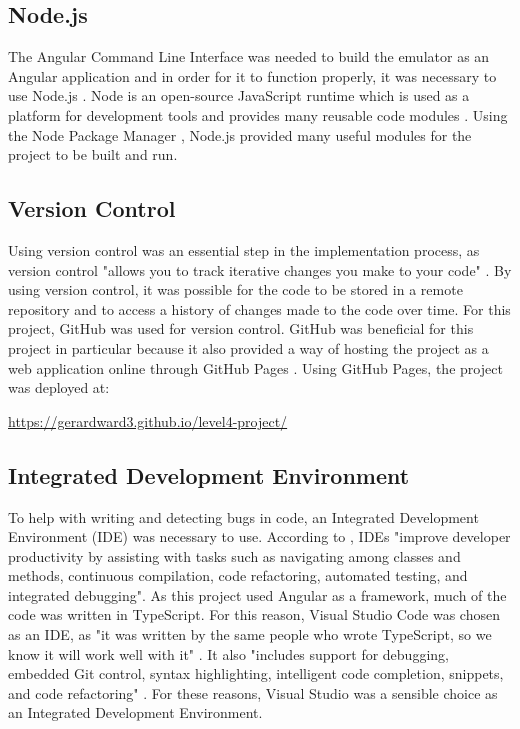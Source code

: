 \documentclass{l4proj}
\begin{document}
\subsection{Node.js}
The Angular Command Line Interface was needed to build the emulator as an Angular application and in order for it to function properly, it was necessary to use Node.js \citep{node19}. Node is an open-source JavaScript runtime which is used as a platform for development tools and provides many reusable code modules \citep{ClowNode18}. Using the Node Package Manager \citep{npm19}, Node.js provided many useful modules for the project to be built and run.

\subsection{Version Control}
Using version control was an essential step in the implementation process, as version control "allows you to track iterative changes you make to your code" \citep{vcs16}. By using version control, it was possible for the code to be stored in a remote repository and to access a history of changes made to the code over time. For this project, GitHub \citep{github19} was used for version control. GitHub was beneficial for this project in particular because it also provided a way of hosting the project as a web application online through GitHub Pages \citep{githubpages19}. Using GitHub Pages, the project was deployed at:

 \url{https://gerardward3.github.io/level4-project/}
 
\subsection{Integrated Development Environment}
To help with writing and detecting bugs in code, an Integrated Development Environment (IDE) was necessary to use. According to \citet{ide15}, IDEs "improve developer productivity by assisting with tasks such as navigating among classes and methods, continuous compilation, code refactoring, automated testing, and integrated debugging". As this project used Angular as a framework, much of the code was written in TypeScript. For this reason, Visual Studio Code was chosen as an IDE, as "it was written by the same people who wrote TypeScript, so we know it will work well with it" \citep{visualstudio18}. It also "includes support for debugging, embedded Git control, syntax highlighting, intelligent code completion, snippets, and code refactoring" \citep{visualstudio18}. For these reasons, Visual Studio was a sensible choice as an Integrated Development Environment.
\end{document}
